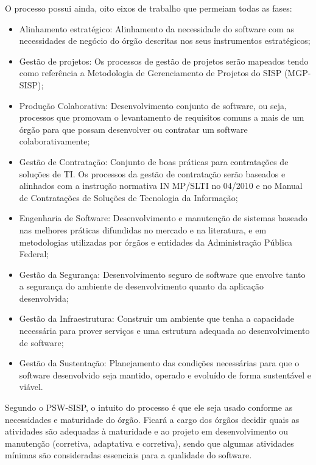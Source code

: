 O processo possui ainda, oito eixos de trabalho que permeiam todas as fases:

\begin{itemize}

\item Alinhamento estratégico: Alinhamento da necessidade do software com as
necessidades de negócio do órgão descritas nos seus instrumentos estratégicos;

\item Gestão de projetos: Os processos de gestão de projetos serão mapeados 
tendo como referência a Metodologia de Gerenciamento de Projetos do SISP (MGP-SISP);

\item Produção Colaborativa: Desenvolvimento conjunto de software, ou seja, processos
que promovam o levantamento de requisitos comuns a mais de um órgão para que 
possam desenvolver ou contratar um software colaborativamente;

\item Gestão de Contratação: Conjunto de boas práticas para contratações de
soluções de TI. Os processos da gestão de contratação serão baseados e alinhados 
com a instrução normativa IN MP/SLTI no 04/2010 e no Manual de Contratações de 
Soluções de Tecnologia da Informação;

\item Engenharia de Software: Desenvolvimento e manutenção de sistemas baseado nas
melhores práticas difundidas no mercado e na literatura, e em metodologias 
utilizadas por órgãos e entidades da Administração Pública Federal;

\item Gestão da Segurança: Desenvolvimento seguro de software que envolve tanto a
segurança do ambiente de desenvolvimento quanto da aplicação desenvolvida;

\item Gestão da Infraestrutura: Construir um ambiente que tenha a capacidade 
necessária para prover serviços e uma estrutura adequada ao desenvolvimento de
software;

\item Gestão da Sustentação: Planejamento das condições necessárias para que o 
software desenvolvido seja mantido, operado e evoluído de forma sustentável e 
viável.
  	
\end{itemize}

Segundo o PSW-SISP, o intuito do processo é que ele seja usado conforme as 
necessidades e maturidade do órgão. Ficará a cargo dos órgãos decidir quais 
as atividades são adequadas à maturidade e ao projeto em desenvolvimento ou 
manutenção (corretiva, adaptativa e corretiva), sendo que algumas atividades 
mínimas são consideradas essenciais para a qualidade do software.
	






